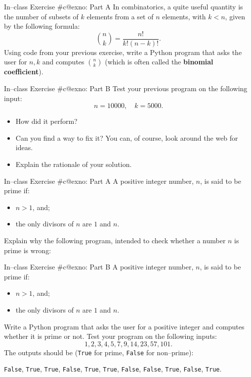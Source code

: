 \documentclass[aspectratio=169, 12pt, xcolor=table]{beamer}
\makeatletter
\newcommand{\arabicthree}[1]{\expandafter\@arabicthree\csname c@#1\endcsname}
\newcommand{\@arabicthree}[1]{\ifnum #1<100 0\fi\ifnum #1<10 0\fi\number#1}
\newcounter{exno}
\newcommand{\exno}{\stepcounter{exno}In--class Exercise \#\arabicthree{exno}}
\makeatother
\begin{document}
	\begin{frame}{\exno: Part A}
		In combinatorics, a quite useful quantity is the number of subsets of $k$ elements from a set of $n$ elements, with $k<n$, given by the following formula:
		\[\binom{n}{k}=\frac{n!}{k!(n-k)!}.\]
		Using code from your previous exercise, write a Python program that asks the user for $n, k$ and computes $\binom{n}{k}$ (which is often called the \textbf{binomial coefficient}).
	\end{frame}

	\addtocounter{exno}{-1}
	
	\begin{frame}{\exno: Part B}
		Test your previous program on the following input:
		\[n=10000,\quad k=5000.\]
		\vspace{-\topsep}
		\begin{itemize}
			\item How did it perform?
			\item Can you find a way to fix it? You can, of course, look around the web for ideas.
			\item Explain the rationale of your solution.
		\end{itemize}
	\end{frame}

	\begin{frame}{\exno: Part A}
		A positive integer number, $n$, is said to be prime if:
		\begin{itemize}
			\item $n>1$, and;
			\item the only divisors of $n$ are $1$ and $n$.
		\end{itemize}
		Explain why the following program, intended to check whether a number $n$ is prime is wrong:
		
	\end{frame}
	
	\addtocounter{exno}{-1}
	
	\begin{frame}{\exno: Part B}
		A positive integer number, $n$, is said to be prime if:
		\begin{itemize}
			\item $n>1$, and;
			\item the only divisors of $n$ are $1$ and $n$.
		\end{itemize}
		Write a Python program that asks the user for a positive integer and computes whether it is prime or not. Test your program on the following inputs:
		\[1, 2, 3, 4, 5, 7, 9, 14, 23, 57, 101.\]
		The outputs should be (\texttt{True} for prime, \texttt{False} for non--prime):
		\begin{center}
			\texttt{False}, \texttt{True}, \texttt{True}, \texttt{False}, \texttt{True}, \texttt{True}, \texttt{False}, \texttt{False}, \texttt{True}, \texttt{False}, \texttt{True}.
		\end{center}
	\end{frame}
\end{document}

